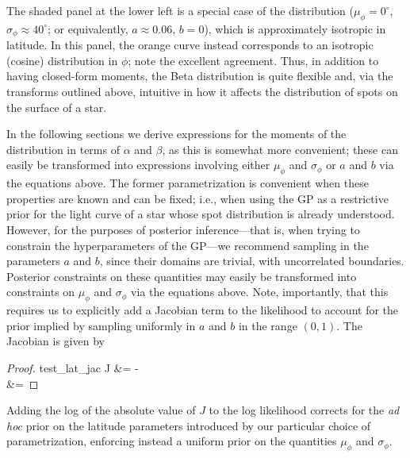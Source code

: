 \documentclass[modern]{aastex62}
\begin{document}
The shaded panel at the lower left is a special case of the distribution
($\mu_\phi = 0^\circ$, $\sigma_\phi \approx 40^\circ$; or equivalently,
$a \approx 0.06$, $b = 0$), which is approximately isotropic in latitude. In
this panel, the orange curve instead corresponds to an isotropic (cosine)
distribution in $\phi$; note the excellent agreement.
%
Thus, in addition to having closed-form moments, the Beta distribution is
quite flexible and, via the transforms outlined above, intuitive in how
it affects the distribution of spots on the surface of a star.

In the following sections we derive expressions
for the moments of the distribution in terms
of $\alpha$ and $\beta$, as this is somewhat more convenient; these
can easily be transformed into expressions involving either $\mu_\phi$ and $\sigma_\phi$
or $a$ and $b$ via the equations above. The former parametrization is convenient
when these properties are known and can be fixed; i.e., when using the GP as
a restrictive prior for the light curve of a star whose spot distribution is
already understood.
However, for the purposes of posterior inference---that is, when trying to
constrain the hyperparameters of the GP---we recommend sampling in the
parameters $a$ and $b$, since their domains are trivial,
with uncorrelated boundaries. Posterior constraints on these quantities may
easily be transformed into constraints on $\mu_\phi$ and $\sigma_\phi$
via the equations above. Note, importantly, that this
requires us to explicitly add a Jacobian term to the likelihood
to account for the prior implied by sampling uniformly in $a$ and $b$
in the range $(0, 1)$.
The Jacobian is given by
%
\begin{proof}{test_lat_jac}
    \label{eq:J}
    J &=
     -
    \\
    &=
    \nonumber
\end{proof}
%
Adding the log of the absolute value of $J$ to the log likelihood
corrects for the \emph{ad hoc}
prior on the latitude parameters introduced by our particular choice of
parametrization, enforcing instead a uniform prior on the quantities $\mu_\phi$
and $\sigma_\phi$.
\end{document}
